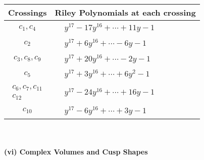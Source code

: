 \documentclass[1p]{elsarticle_modified}
\theoremstyle{definition}
\begin{document}
\begin{tabular}{m{50pt}|m{274pt}}
Crossings & \hspace{64pt}Riley Polynomials at each crossing \\
\hline $$\begin{aligned}c_{1},c_{4}\end{aligned}$$&$\begin{aligned}
&y^{17}-17 y^{16}+\cdots+11 y-1
\end{aligned}$\\
\hline $$\begin{aligned}c_{2}\end{aligned}$$&$\begin{aligned}
&y^{17}+6 y^{16}+\cdots-6 y-1
\end{aligned}$\\
\hline $$\begin{aligned}c_{3},c_{8},c_{9}\end{aligned}$$&$\begin{aligned}
&y^{17}+20 y^{16}+\cdots-2 y-1
\end{aligned}$\\
\hline $$\begin{aligned}c_{5}\end{aligned}$$&$\begin{aligned}
&y^{17}+3 y^{16}+\cdots+6 y^2-1
\end{aligned}$\\
\hline $$\begin{aligned}c_{6},c_{7},c_{11}\\c_{12}\end{aligned}$$&$\begin{aligned}
&y^{17}-24 y^{16}+\cdots+16 y-1
\end{aligned}$\\
\hline $$\begin{aligned}c_{10}\end{aligned}$$&$\begin{aligned}
&y^{17}-6 y^{16}+\cdots+3 y-1
\end{aligned}$\\
\hline
\end{tabular}\\~\\
\newpage\flushleft \textbf{(vi) Complex Volumes and Cusp Shapes}
\end{document}
